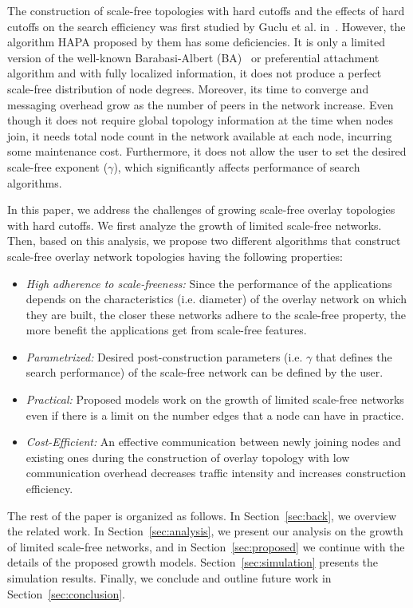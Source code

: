 \documentclass[10pt,journal,cspaper,compsoc]{IEEEtran}
\begin{document}
The construction of scale-free topologies with hard cutoffs and the effects of hard cutoffs on the search efficiency was first studied by Guclu et al. in~\cite{guclu}. However, the algorithm HAPA proposed by them has some deficiencies.
It is only a limited version of the well-known Barabasi-Albert (BA)~\cite{ba} or preferential attachment algorithm and with fully localized information, it
does not produce a perfect scale-free distribution of node degrees. Moreover, its time to converge and messaging overhead grow as the number of peers in the network increase. Even though it does not require global topology information at the time when nodes join, it needs total node count in the network available at each node, 
incurring some maintenance cost. Furthermore, it does not allow the user to set the desired scale-free exponent ($\gamma$), which significantly affects performance of search algorithms. 

In this paper, we address the challenges of growing scale-free overlay topologies with hard cutoffs. We first analyze the growth of limited scale-free networks. Then, based on this analysis, we propose two different algorithms that construct scale-free overlay network topologies having the following properties:
\begin{itemize}
\item{\it High adherence to scale-freeness:} Since the performance of the applications depends on the characteristics (i.e. diameter) of the overlay network on which they are built, the closer these networks adhere to the scale-free property, the more benefit the applications get from scale-free features.
\item{\it Parametrized:} Desired post-construction parameters (i.e. $\gamma$ that defines the search performance) of the scale-free network can be defined by the user.
\item{\it Practical:} Proposed models work on the growth of limited scale-free networks even if there is a limit on the number edges that a node can have in practice.
\item{\it Cost-Efficient:} An effective communication between newly joining nodes and existing ones during the construction of overlay topology with low communication overhead decreases traffic intensity and increases construction efficiency.
\end{itemize}

The rest of the paper is organized as follows. In Section~\ref{sec:back}, we overview the related work. In Section~\ref{sec:analysis}, we present our analysis on the growth of limited scale-free networks, and in Section~\ref{sec:proposed} we continue with the details of the proposed growth models. 
Section~\ref{sec:simulation} presents the simulation results. Finally, we conclude and outline future work in Section~\ref{sec:conclusion}.
\end{document}

